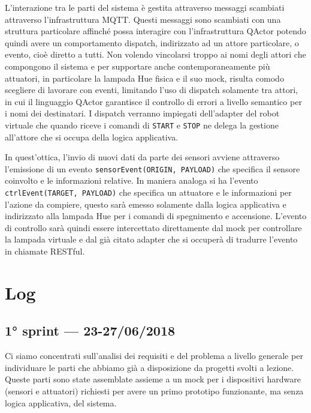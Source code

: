 L'interazione tra le parti del sistema è gestita attraverso messaggi scambiati attraverso l'infrastruttura MQTT. Questi messaggi sono scambiati con una struttura particolare affinché possa interagire con l'infrastruttura QActor potendo quindi avere un comportamento dispatch, indirizzato ad un attore particolare, o evento, cioè diretto a tutti. Non volendo vincolarsi troppo ai nomi degli attori che compongono il sistema e per supportare anche contemporaneamente più attuatori, in particolare la lampada Hue fisica e il suo mock, risulta comodo scegliere di lavorare con eventi, limitando l'uso di dispatch solamente tra attori, in cui il linguaggio QActor garantisce il controllo di errori a livello semantico per i nomi dei destinatari. I dispatch verranno impiegati dell'adapter del robot virtuale che quando riceve i comandi di \texttt{START} e \texttt{STOP} ne delega la gestione all'attore che si occupa della logica applicativa.

In quest'ottica, l'invio di nuovi dati da parte dei sensori avviene attraverso l'emissione di un evento \texttt{sensorEvent(ORIGIN, PAYLOAD)} che specifica il sensore coinvolto e le informazioni relative. In maniera analoga si ha l'evento \texttt{ctrlEvent(TARGET, PAYLOAD)} che specifica un attuatore e le informazioni per l'azione da compiere, questo sarà emesso solamente dalla logica applicativa e indirizzato alla lampada Hue per i comandi di spegnimento e accensione. L'evento di controllo sarà quindi essere intercettato direttamente dal mock per controllare la lampada virtuale e dal già citato adapter che si occuperà di tradurre l'evento in chiamate RESTful.

\section{Log}

\subsection{1° sprint –– 23-27/06/2018}
Ci siamo concentrati sull'analisi dei requisiti e del problema a livello generale per individuare le parti che abbiamo già a disposizione da progetti svolti a lezione. Queste parti sono state assemblate assieme a un mock per i dispositivi hardware (sensori e attuatori) richiesti per avere un primo prototipo funzionante, ma senza logica applicativa, del sistema.


